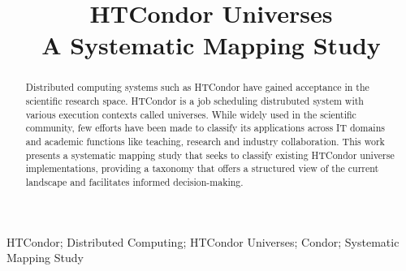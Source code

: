 \documentclass[]{interact}
\theoremstyle{plain}%
\theoremstyle{definition}
\theoremstyle{remark}
\begin{document}

\title{
	HTCondor Universes\\
	A Systematic Mapping Study
}


\author{
}

\maketitle

\begin{abstract}
	Distributed computing systems such as HTCondor have gained acceptance in the scientific research space. HTCondor is a job scheduling distrubuted system with various execution contexts called universes. While widely used in the scientific community, few efforts have been made to classify its applications across IT domains and academic functions like teaching, research and industry collaboration. This work presents a systematic mapping study that seeks to classify existing HTCondor universe implementations, providing a taxonomy that offers a structured view of the current landscape and facilitates informed decision-making.
\end{abstract}

\begin{keywords}
	HTCondor; Distributed Computing; HTCondor Universes; Condor; Systematic Mapping Study
\end{keywords}












\end{document}
